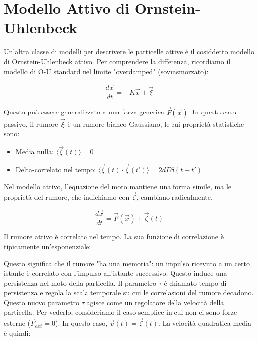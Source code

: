 \section{Modello Attivo di Ornstein-Uhlenbeck}
Un'altra classe di modelli per descrivere le particelle attive è il cosiddetto modello di Ornstein-Uhlenbeck attivo. Per comprendere la differenza, ricordiamo il modello di O-U standard nel limite "overdamped" (sovrasmorzato):

\begin{equation} \label{eq:ch27_4}
\frac{d\vec{x}}{dt}=-K\vec{x}+\vec{\xi}
\end{equation}

Questo può essere generalizzato a una forza generica $\vec{F}(\vec{x})$. In questo caso passivo, il rumore $\vec{\xi}$ è un rumore bianco Gaussiano, le cui proprietà statistiche sono:
\begin{itemize}
    \item Media nulla: $\langle\vec{\xi}(t)\rangle = 0$
    \item Delta-correlato nel tempo: $\langle\vec{\xi}(t)\cdot\vec{\xi}(t')\rangle = 2dD \delta(t-t')$
\end{itemize}

Nel modello attivo, l'equazione del moto mantiene una forma simile, ma le proprietà del rumore, che indichiamo con $\vec{\zeta}$, cambiano radicalmente.

\begin{equation} \label{eq:ch27_5}
\frac{d\vec{x}}{dt}=\vec{F}(\vec{x})+\vec{\zeta}(t)
\end{equation}

Il rumore attivo è correlato nel tempo. La sua funzione di correlazione è tipicamente un'esponenziale:

\vspace{0.5cm}
\noindent{}
\vspace{0.5cm}

Questo significa che il rumore "ha una memoria": un impulso ricevuto a un certo istante è correlato con l'impulso all'istante successivo. Questo induce una persistenza nel moto della particella. Il parametro $\tau$ è chiamato tempo di persistenza e regola la scala temporale su cui le correlazioni del rumore decadono.
Questo nuovo parametro $\tau$ agisce come un regolatore della velocità della particella. Per vederlo, consideriamo il caso semplice in cui non ci sono forze esterne ($\vec{F}_{ext}=0$).
In questo caso, $\vec{v}(t) = \vec{\zeta}(t)$. La velocità quadratica media è quindi:

